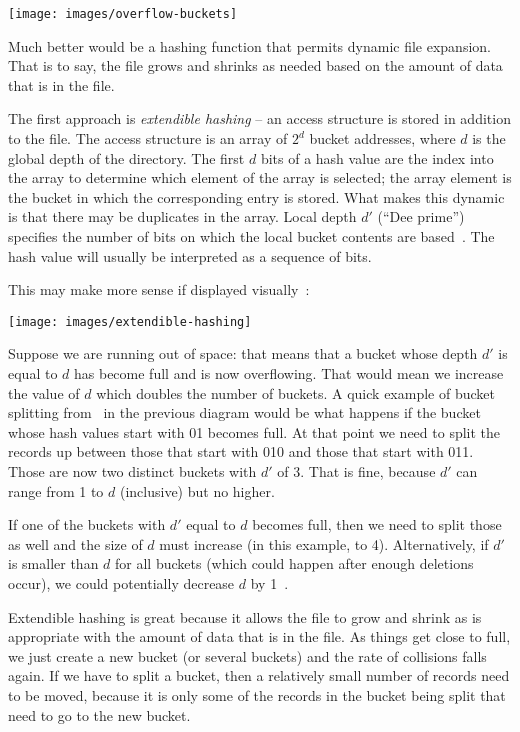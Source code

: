 \documentclass[a4paper]{report}
\begin{document}
\begin{center}
	\texttt{[image: images/overflow-buckets]}
\end{center}

Much better would be a hashing function that permits dynamic file expansion. That is to say, the file grows and shrinks as needed based on the amount of data that is in the file.

The first approach is \textit{extendible hashing} -- an access structure is stored in addition to the file. The access structure is an array of $2^{d}$ bucket addresses, where $d$ is the global depth of the directory. The first $d$ bits of a hash value are the index into the array to determine which element of the array is selected; the array element is the bucket in which the corresponding entry is stored. What makes this dynamic is that there may be duplicates in the array. Local depth $d'$ (``Dee prime'') specifies the number of bits on which the local bucket contents are based~\cite{fds}. The hash value will usually be interpreted as a sequence of bits.

This may make more sense if displayed visually~\cite{fds}:

\begin{center}
	\texttt{[image: images/extendible-hashing]}
\end{center}

Suppose we are running out of space: that means that a bucket whose depth $d'$ is equal to $d$ has become full and is now overflowing. That would mean we increase the value of $d$ which doubles the number of buckets. A quick example of bucket splitting from~\cite{fds} in the previous diagram would be what happens if the bucket whose hash values start with 01 becomes full. At that point we need to split the records up between those that start with 010 and those that start with 011. Those are now two distinct buckets with $d'$ of 3. That is fine, because $d'$ can range from 1 to $d$ (inclusive) but no higher.  

If one of the buckets with $d'$ equal to $d$ becomes full, then we need to split those as well and the size of $d$ must increase (in this example, to 4). Alternatively, if $d'$ is smaller than $d$ for all buckets (which could happen after enough deletions occur), we could potentially decrease $d$ by 1~\cite{fds}.

Extendible hashing is great because it allows the file to grow and shrink as is appropriate with the amount of data that is in the file. As things get close to full, we just create a new bucket (or several buckets) and the rate of collisions falls again. If we have to split a bucket, then a relatively small number of records need to be moved, because it is only some of the records in the bucket being split that need to go to the new bucket. 
\end{document}
